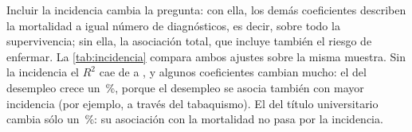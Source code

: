 Incluir la incidencia cambia la pregunta: con ella, los demás coeficientes describen la mortalidad
a igual número de diagnósticos, es decir, sobre todo la supervivencia; sin ella, la asociación
total, que incluye también el riesgo de enfermar. La \cref{tab:incidencia} compara ambos ajustes
sobre la misma muestra. Sin la incidencia el $R^2$ cae de  a
, y algunos coeficientes cambian mucho: el del desempleo crece un
\,\%, porque el desempleo se asocia también con mayor incidencia (por ejemplo,
a través del tabaquismo). El del título universitario cambia sólo un \,\%: su
asociación con la mortalidad no pasa por la incidencia.



